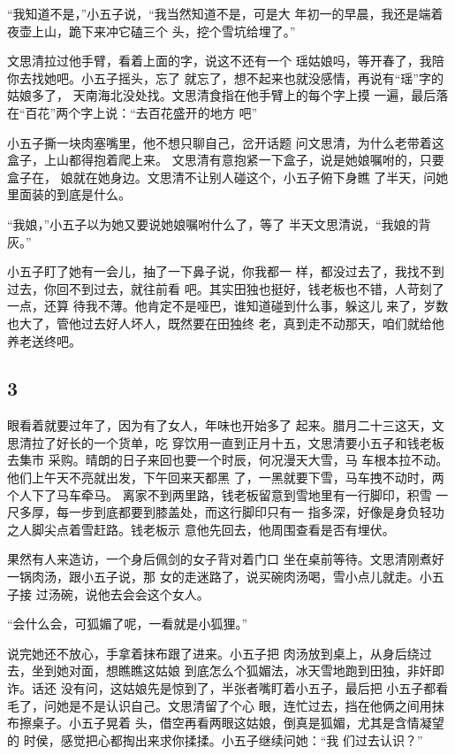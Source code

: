 “我知道不是，”小五子说，“我当然知道不是，可是大
年初一的早晨，我还是端着夜壶上山，跪下来冲它磕三个
头，挖个雪坑给埋了。”

文思清拉过他手臂，看着上面的字，说这不还有一个
瑶姑娘吗，等开春了，我陪你去找她吧。小五子摇头，忘了
就忘了，想不起来也就没感情，再说有“瑶”字的姑娘多了，
天南海北没处找。文思清食指在他手臂上的每个字上摸
一遍，最后落在“百花”两个字上说：“去百花盛开的地方
吧”

小五子撕一块肉塞嘴里，他不想只聊自己，岔开话题
问文思清，为什么老带着这盒子，上山都得抱着爬上来。
文思清有意抱紧一下盒子，说是她娘嘱咐的，只要盒子在，
娘就在她身边。文思清不让别人碰这个，小五子俯下身瞧
了半天，问她里面装的到底是什么。

“我娘，”小五子以为她又要说她娘嘱咐什么了，等了
半天文思清说，“我娘的背灰。”

小五子盯了她有一会儿，抽了一下鼻子说，你我都一
样，都没过去了，我找不到过去，你回不到过去，就往前看
吧。其实田独也挺好，钱老板也不错，人苛刻了一点，还算
待我不薄。他肯定不是哑巴，谁知道碰到什么事，躲这儿
来了，岁数也大了，管他过去好人坏人，既然要在田独终
老，真到走不动那天，咱们就给他养老送终吧。
\newline

{\centering\subsection{3}}

眼看着就要过年了，因为有了女人，年味也开始多了
起来。腊月二十三这天，文思清拉了好长的一个货单，吃
穿饮用一直到正月十五，文思清要小五子和钱老板去集市
采购。晴朗的日子来回也要一个时辰，何况漫天大雪，马
车根本拉不动。他们上午天不亮就出发，下午回来天都黑
了，一黑就要下雪，马车拽不动时，两个人下了马车牵马。
离家不到两里路，钱老板留意到雪地里有一行脚印，积雪
一尺多厚，每一步到底都要到膝盖处，而这行脚印只有一
指多深，好像是身负轻功之人脚尖点着雪赶路。钱老板示
意他先回去，他周围查看是否有埋伏。

果然有人来造访，一个身后佩剑的女子背对着门口
坐在桌前等待。文思清刚煮好一锅肉汤，跟小五子说，那
女的走迷路了，说买碗肉汤喝，雪小点儿就走。小五子接
过汤碗，说他去会会这个女人。

“会什么会，可狐媚了呢，一看就是小狐狸。”

说完她还不放心，手拿着抹布跟了进来。小五子把
肉汤放到桌上，从身后绕过去，坐到她对面，想瞧瞧这姑娘
到底怎么个狐媚法，冰天雪地跑到田独，非奸即诈。话还
没有问，这姑娘先是惊到了，半张者嘴盯着小五子，最后把
小五子都看毛了，问她是不是认识自己。文思清留了个心
眼，连忙过去，挡在他俩之间用抹布擦桌子。小五子晃着
头，借空再看两眼这姑娘，倒真是狐媚，尤其是含情凝望的
时侯，感觉把心都掏出来求你揉揉。小五子继续问她：“我
们过去认识？”

